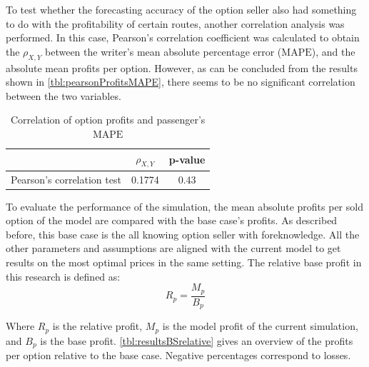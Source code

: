 To test whether the forecasting accuracy of the option seller also had something to do with the profitability of certain routes, another correlation analysis was performed. In this case, Pearson's correlation coefficient was calculated to obtain the $\rho_{X,Y}$ between the writer's mean absolute percentage error ($\mbox{MAPE}$), and the absolute mean profits per option. However, as can be concluded from the results shown in \autoref{tbl:pearsonProfitsMAPE}, there seems to be no significant correlation between the two variables.

\begin{table}
\centering
\begin{tabular}{l c c}
\toprule
~  &  $\rho_{X,Y}$  &  p-value   \\
\midrule
Pearson's correlation test &  0.1774  &  0.43  \\
\bottomrule
\end{tabular}
\caption{Correlation of option profits and passenger's $\mbox{MAPE}$}
\label{tbl:pearsonProfitsMAPE}
\end{table}


To evaluate the performance of the simulation, the mean absolute profits per sold option of the model are compared with the base case's profits. As described before, this base case is the all knowing option seller with foreknowledge. All the other parameters and assumptions are aligned with the current model to get results on the most optimal prices in the same setting. The relative base profit in this research is defined as:
$$R_p =  \frac{M_p}{B_p}$$

Where $R_p$ is the relative profit, $M_p$ is the model profit of the current simulation, and $B_p$ is the base profit. \autoref{tbl:resultsBSrelative} gives an overview of the profits per option relative to the base case. Negative percentages correspond to losses.


